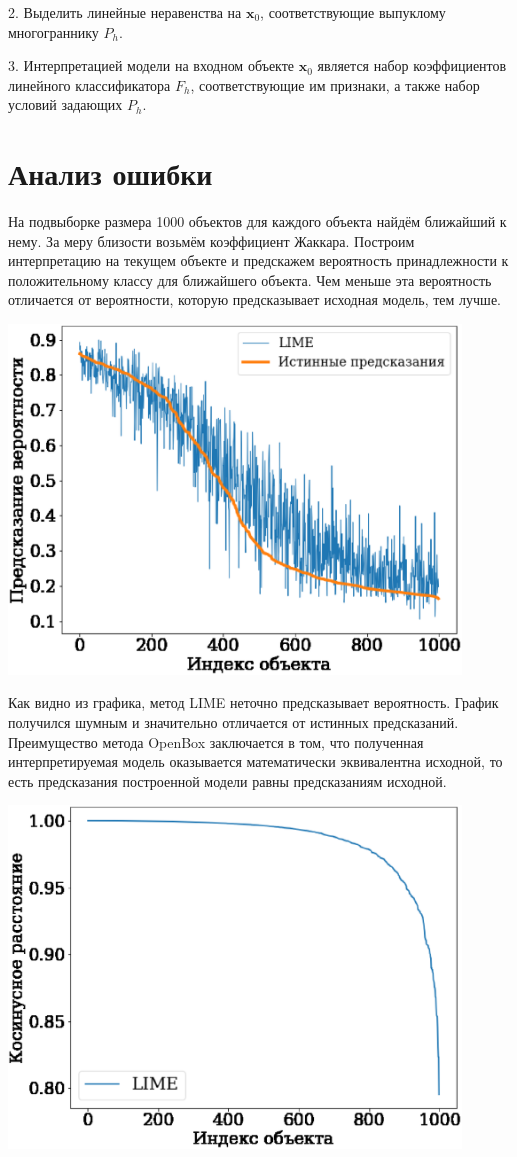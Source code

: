 \documentclass[a4paper, 12pt]{article}
\begin{document}
2. Выделить линейные неравенства на $\mathbf{x}_0$, соответствующие выпуклому многограннику $P_h$.

3. Интерпретацией модели на входном объекте $\mathbf{x}_0$ является набор коэффициентов линейного классификатора $F_h$, соответствующие им признаки, а также набор условий задающих $P_h$.

\section{Анализ ошибки}
На подвыборке размера 1000 объектов для каждого объекта найдём ближайший к нему. За меру близости возьмём коэффициент Жаккара. Построим интерпретацию на текущем объекте и предскажем вероятность принадлежности к положительному классу для ближайшего объекта. Чем меньше эта вероятность отличается от вероятности, которую предсказывает исходная модель, тем лучше. 

\includegraphics[width=0.9\textwidth]{../figures/lime_proba.eps}

Как видно из графика, метод LIME неточно предсказывает вероятность. График получился шумным и значительно отличается от истинных предсказаний. Преимущество метода OpenBox заключается в том, что полученная интерпретируемая модель оказывается математически эквивалентна исходной, то есть предсказания построенной модели равны предсказаниям исходной.

\includegraphics[width=0.9\textwidth]{../figures/lime_cosine.eps}
\end{document}
